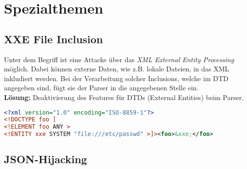 \section{Spezialthemen}


\subsection{XXE File Inclusion}
Unter dem Begriff ist eine Attacke über das \textit{XML External Entity Processing} möglich. Dabei können externe Daten, wie z.B. lokale Dateien, in das XML inkludiert werden. Bei der Verarbeitung solcher Inclusions, welche im DTD angegeben sind, fügt sie der Parser in die angegebenen Stelle ein.\\

\textbf{Lösung:} Deaktivierung des Features für DTDs (External Entities) beim Parser.

\begin{lstlisting}[language=XML, caption=Beispiel der XXE]
<?xml version="1.0" encoding="ISO-8859-1"?>
<!DOCTYPE foo [  
<!ELEMENT foo ANY >
<!ENTITY xxe SYSTEM "file:///etc/passwd" >]><foo>&xxe;</foo>
\end{lstlisting}

\subsection{JSON-Hijacking}


